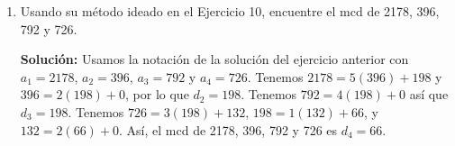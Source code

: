 \begin{enumerate}
    \item Usando su método ideado en el Ejercicio 10, encuentre el mcd de 2178, 396, 792 y 726.
    
    \textbf{Solución:} Usamos la notación de la solución del ejercicio anterior con \( a_1 = 2178 \), \( a_2 = 396 \), \( a_3 = 792 \) y \( a_4 = 726 \). Tenemos \( 2178 = 5(396) + 198 \) y \( 396 = 2(198) + 0 \), por lo que \( d_2 = 198 \). Tenemos \( 792 = 4(198) + 0 \) así que \( d_3 = 198 \). Tenemos \( 726 = 3(198) + 132 \), \( 198 = 1(132) + 66 \), y \( 132 = 2(66) + 0 \). Así, el mcd de 2178, 396, 792 y 726 es \( d_4 = 66 \).
\end{enumerate}